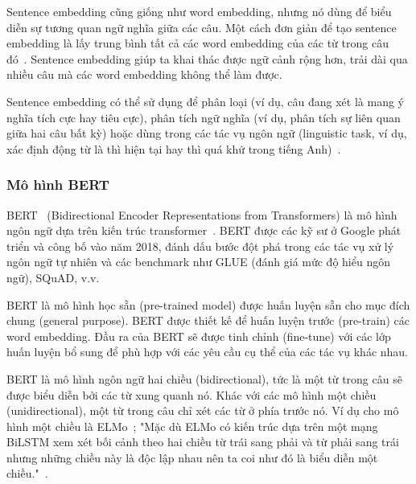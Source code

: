 
Sentence embedding cũng giống như word embedding, nhưng nó dùng để biểu diễn sự
tương quan ngữ nghĩa giữa các câu. Một cách đơn giản để tạo sentence embedding
là lấy trung bình tất cả các word embedding của các từ trong câu
đó~\cite{lamGomCumVan2021}. Sentence embedding giúp ta khai thác được ngữ cảnh rộng hơn, trải dài qua nhiều câu mà các word embedding không thể làm được.

Sentence embedding có thể sử dụng để phân loại (ví dụ, câu đang xét là mang ý
nghĩa tích cực hay tiêu cực), phân tích ngữ nghĩa (ví dụ, phân tích sự liên
quan giữa hai câu bất kỳ) hoặc dùng trong các tác vụ ngôn ngữ (linguistic task,
ví dụ, xác định động từ là thì hiện tại hay thì quá khứ trong tiếng
Anh)~\cite{heidenreichPaperSummaryEvaluation2018}.

\subsubsection{Mô hình BERT}
BERT~\cite{devlinBERTPretrainingDeep2019} (Bidirectional Encoder
Representations from Transformers) là mô hình ngôn ngữ dựa trên kiến trúc
transformer~\cite{vaswaniAttentionAllYou2017}. BERT được các kỹ sư ở Google
phát triển và công bố vào năm 2018, đánh dấu bước đột phá trong các tác vụ xử
lý ngôn ngữ tự nhiên và các benchmark như GLUE (đánh giá mức độ hiểu ngôn ngữ),
SQuAD, v.v.

BERT là mô hình học sẵn (pre-trained model) được huấn luyện sẵn cho mục đích
chung (general purpose). BERT được thiết kế để huấn luyện trước (pre-train) các word embedding. Đầu ra của BERT sẽ được tinh chỉnh (fine-tune) với các
lớp huấn luyện bổ sung để phù hợp với các yêu cầu cụ thể của các tác vụ khác
nhau.

BERT là mô hình ngôn ngữ hai chiều (bidirectional), tức là một từ trong câu sẽ
được biểu diễn bởi các từ xung quanh nó. Khác với các mô hình một chiều
(unidirectional), một từ trong câu chỉ xét các từ ở phía trước nó. Ví dụ cho mô
hình một chiều là ELMo~\cite{petersDeepContextualizedWord2018}; "Mặc dù ELMo có
kiến trúc dựa trên một mạng BiLSTM xem xét bối cảnh theo hai chiều từ trái sang
phải và từ phải sang trái nhưng những chiều này là độc lập nhau nên ta coi như
đó là biểu diễn một chiều."~\cite{khanhBERTModel2020}.


